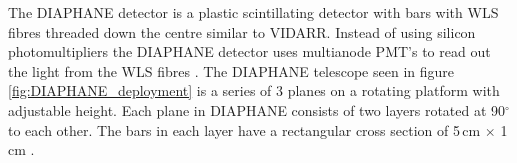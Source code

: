 \begin{figure}[!h]
\begin{minipage}{.45\textwidth}
  \label{fig:mtAsma3dMap}
\end{minipage}
\end{figure}

The DIAPHANE detector is a plastic scintillating detector with bars with WLS fibres threaded down the centre similar to VIDARR. Instead of using silicon photomultipliers the DIAPHANE detector uses multianode PMT’s to read out the light from the WLS fibres \cite{Marteau_2017}. The DIAPHANE telescope seen in figure \ref{fig:DIAPHANE_deployment} is a series of 3 planes on a rotating platform with adjustable height. Each plane in DIAPHANE consists of two layers rotated at 90$^\circ$ to each other. The bars in each layer have a rectangular cross section of 5\,cm $\times$ 1\,cm \cite{MARTEAU201223}. 
